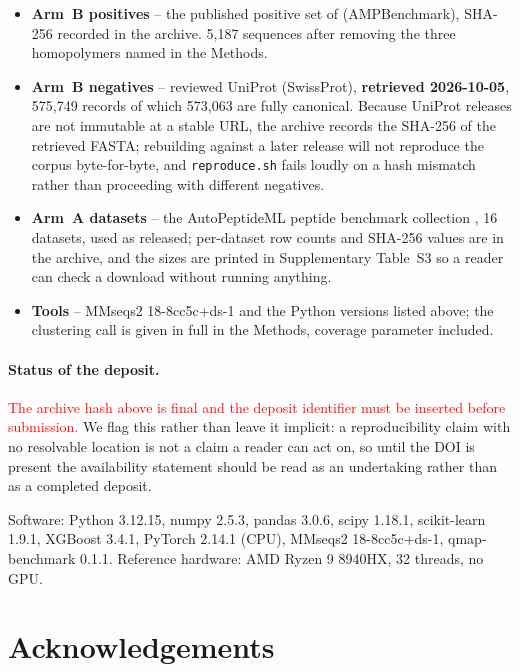 \documentclass[11pt,a4paper]{article}
\begin{document}
\begin{itemize}[leftmargin=1.4em,itemsep=2pt]
\item \textbf{Arm~B positives} -- the published positive set of
  \citet{sidorczuk2022negative} (AMPBenchmark), SHA-256 recorded in the archive. 5{,}187
  sequences after removing the three homopolymers named in the Methods.
\item \textbf{Arm~B negatives} -- reviewed UniProt (SwissProt), \textbf{retrieved
  2026-10-05}, 575{,}749 records of which 573{,}063 are fully canonical. Because UniProt
  releases are not immutable at a stable URL, the archive records the SHA-256 of the
  retrieved FASTA; rebuilding against a later release will not reproduce the corpus
  byte-for-byte, and \texttt{reproduce.sh} fails loudly on a hash mismatch rather than
  proceeding with different negatives.
\item \textbf{Arm~A datasets} -- the AutoPeptideML peptide benchmark collection
  \citep{fernandezdiaz2024autopeptideml}, 16 datasets, used as released; per-dataset row
  counts and SHA-256 values are in the archive, and the sizes are printed in
  Supplementary Table~S3 so a reader can check a download without running anything.
\item \textbf{Tools} -- MMseqs2 18-8cc5c+ds-1 and the Python versions listed above; the
  clustering call is given in full in the Methods, coverage parameter included.
\end{itemize}

\paragraph{Status of the deposit.} \textcolor{red}{The archive hash above is final and the
deposit identifier must be inserted before submission.} We flag this rather than leave it
implicit: a reproducibility claim with no resolvable location is not a claim a reader can
act on, so until the DOI is present the availability statement should be read as an
undertaking rather than as a completed deposit.

Software: Python 3.12.15, numpy 2.5.3, pandas 3.0.6, scipy 1.18.1, scikit-learn 1.9.1,
XGBoost 3.4.1, PyTorch 2.14.1 (CPU), MMseqs2 18-8cc5c+ds-1, qmap-benchmark 0.1.1.
Reference hardware: AMD Ryzen 9 8940HX, 32 threads, no GPU.

\section*{Acknowledgements}
\end{document}

